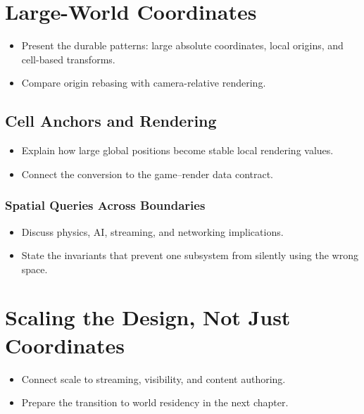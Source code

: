 \documentclass[
  11pt,
  letterpaper,
  DIV=11,
  numbers=noendperiod,
  twoside,
  open=right]{scrreprt}
\providecommand{\tightlist}{%
  \setlength{\itemsep}{0pt}\setlength{\parskip}{0pt}}
\begin{document}
\section{Large-World Coordinates}\label{large-world-coordinates}

\begin{itemize}
\tightlist
\item
  Present the durable patterns: large absolute coordinates, local
  origins, and cell-based transforms.
\item
  Compare origin rebasing with camera-relative rendering.
\end{itemize}

\subsection{Cell Anchors and
Rendering}\label{cell-anchors-and-rendering}

\begin{itemize}
\tightlist
\item
  Explain how large global positions become stable local rendering
  values.
\item
  Connect the conversion to the game--render data contract.
\end{itemize}

\subsubsection{Spatial Queries Across
Boundaries}\label{spatial-queries-across-boundaries}

\begin{itemize}
\tightlist
\item
  Discuss physics, AI, streaming, and networking implications.
\item
  State the invariants that prevent one subsystem from silently using
  the wrong space.
\end{itemize}

\section{Scaling the Design, Not Just
Coordinates}\label{scaling-the-design-not-just-coordinates}

\begin{itemize}
\tightlist
\item
  Connect scale to streaming, visibility, and content authoring.
\item
  Prepare the transition to world residency in the next chapter.
\end{itemize}
\end{document}
